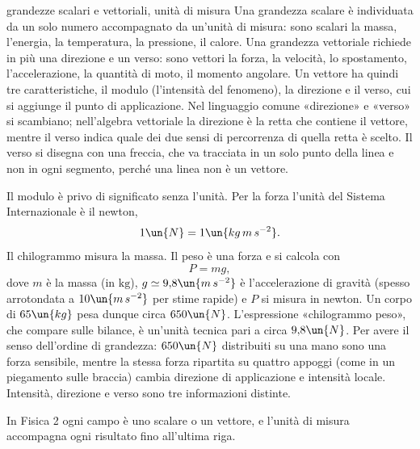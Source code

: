 \documentclass[main.tex]{subfiles}
\begin{document}
\renewcommand{\richiamoprefix}{Richiamo di Matematica --- }
\begin{riquadro}{grandezze scalari e vettoriali, unità di misura}
Una grandezza scalare è individuata da un solo numero accompagnato da un'unità di misura: sono scalari la massa, l'energia, la temperatura, la pressione, il calore. Una grandezza vettoriale richiede in più una direzione e un verso: sono vettori la forza, la velocità, lo spostamento, l'accelerazione, la quantità di moto, il momento angolare. Un vettore ha quindi tre caratteristiche, il modulo (l'intensità del fenomeno), la direzione e il verso, cui si aggiunge il punto di applicazione. Nel linguaggio comune «direzione» e «verso» si scambiano; nell'algebra vettoriale la direzione è la retta che contiene il vettore, mentre il verso indica quale dei due sensi di percorrenza di quella retta è scelto. Il verso si disegna con una freccia, che va tracciata in un solo punto della linea e non in ogni segmento, perché una linea non è un vettore.

Il modulo è privo di significato senza l'unità. Per la forza l'unità del Sistema Internazionale è il newton,
\[
1\un{N}=1\un{kg\,m\,s^{-2}} .
\]
Il chilogrammo misura la massa. Il peso è una forza e si calcola con
\[
P=mg ,
\]
dove $m$ è la massa (in $\mathrm{kg}$), $g\simeq 9{,}8\un{m\,s^{-2}}$ è l'accelerazione di gravità (spesso arrotondata a $10\un{m\,s^{-2}}$ per stime rapide) e $P$ si misura in newton. Un corpo di $65\un{kg}$ pesa dunque circa $650\un{N}$. L'espressione «chilogrammo peso», che compare sulle bilance, è un'unità tecnica pari a circa $9{,}8\un{N}$. Per avere il senso dell'ordine di grandezza: $650\un{N}$ distribuiti su una mano sono una forza sensibile, mentre la stessa forza ripartita su quattro appoggi (come in un piegamento sulle braccia) cambia direzione di applicazione e intensità locale. Intensità, direzione e verso sono tre informazioni distinte.

In Fisica 2 ogni campo è uno scalare o un vettore, e l'unità di misura accompagna ogni risultato fino all'ultima riga.
\end{riquadro}
\end{document}
